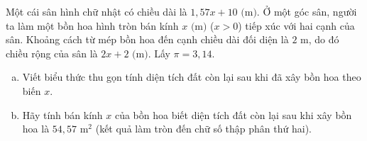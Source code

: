 \begin{bt}%
	Một cái sân hình chữ nhật có chiều dài là $1{,}57x + 10\text{ (m)}$. Ở một góc sân, người ta làm một bồn hoa hình tròn bán kính $x\text{ (m)}$ ($x > 0$) tiếp xúc với hai cạnh của sân. Khoảng cách từ mép bồn hoa đến cạnh chiều dài đối diện là $2\text{ m}$, do đó chiều rộng của sân là $2x + 2\text{ (m)}$. Lấy $\pi = 3{,}14$.
	\begin{enumerate}[a)]
		\item Viết biểu thức thu gọn tính diện tích đất còn lại sau khi đã xây bồn hoa theo biến $x$.
		\item Hãy tính bán kính $x$ của bồn hoa biết diện tích đất còn lại sau khi xây bồn hoa là $54{,}57\text{ m}^2$ (kết quả làm tròn đến chữ số thập phân thứ hai).
	\end{enumerate}
\end{bt}


